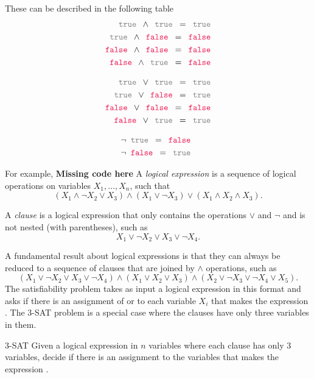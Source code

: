 These can be described in the following table
\begin{align}
\true \land \true = \true\\
\true \land \false = \false\\
\false \land \false = \false\\
\false \land \true = \false
\end{align}

\begin{align}
\true \lor \true = \true\\
\true \lor \false = \true\\
\false \lor \false = \false\\
\false \lor \true = \true
\end{align}

\begin{align}
\neg \true = \false\\
\neg \false = \true
\end{align}

For example, \textbf{Missing code here}
A \emph{logical expression} is a sequence of logical operations on variables $X_1, \dots, X_n$, such that 
\begin{equation}
(X_1 \land \neg X_2 \lor X_3) \land (X_1 \lor \neg X_3) \lor (X_1 \land X_2 \land X_3).
\end{equation}

A \emph{clause} is a logical expression that only contains the operations $\lor$ and $\neg$ and is not nested (with parentheses), such as 
\begin{equation}
X_1 \lor \neg X_2 \lor X_3 \lor \neg X_4.
\end{equation}

A fundamental result about logical expressions is that they can always be reduced to a sequence of clauses that are joined by $\land$ operations, such as 
\begin{equation}
(X_1 \lor \neg X_2 \lor X_3 \lor \neg X_4) \land (X_1 \lor X_2 \lor X_3) \land (X_2 \lor \neg X_3 \lor \neg X_4 \lor X_5).
\end{equation}
The satisfiability problem takes as input a logical expression in this format and asks if there is an assignment of \true  or \false to each variable $X_i$ that makes the expression \true.  The 3-SAT problem is a special case where the clauses have only three variables in them.
 
\begin{general}{3-SAT}{\npcomplete}
Given a logical expression in $n$ variables where each clause has only 3 variables, decide if there is an assignment to the variables that makes the expression \true.
\end{general}


